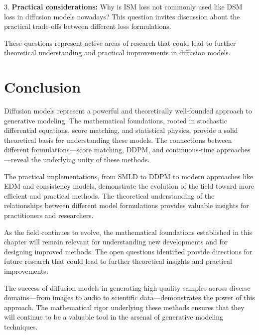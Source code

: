 3. \textbf{Practical considerations:} Why is ISM loss not commonly used like DSM loss in diffusion models nowadays? This question invites discussion about the practical trade-offs between different loss formulations.

These questions represent active areas of research that could lead to further theoretical understanding and practical improvements in diffusion models.

\section{Conclusion}

Diffusion models represent a powerful and theoretically well-founded approach to generative modeling. The mathematical foundations, rooted in stochastic differential equations, score matching, and statistical physics, provide a solid theoretical basis for understanding these models. The connections between different formulations—score matching, DDPM, and continuous-time approaches—reveal the underlying unity of these methods.

The practical implementations, from SMLD to DDPM to modern approaches like EDM and consistency models, demonstrate the evolution of the field toward more efficient and practical methods. The theoretical understanding of the relationships between different model formulations provides valuable insights for practitioners and researchers.

As the field continues to evolve, the mathematical foundations established in this chapter will remain relevant for understanding new developments and for designing improved methods. The open questions identified provide directions for future research that could lead to further theoretical insights and practical improvements.

The success of diffusion models in generating high-quality samples across diverse domains---from images to audio to scientific data---demonstrates the power of this approach. The mathematical rigor underlying these methods ensures that they will continue to be a valuable tool in the arsenal of generative modeling techniques.
